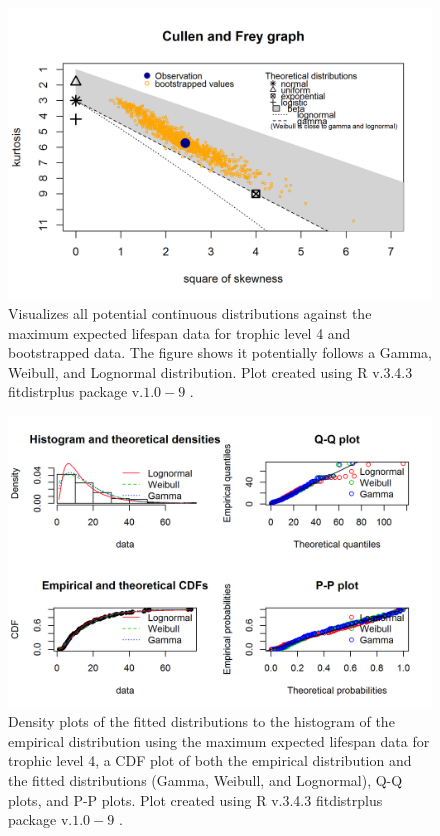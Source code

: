\documentclass[oneside,12pt,final]{sty/ucthesis-CA2012}
\let\cite\citep                             %
\begin{document}
\begin{mainmatter}
\begin{figure}[H]
     \centering
       \includegraphics[width=.8\textwidth]{fig/cullen_frey_l4}
    \caption{Visualizes all potential continuous distributions against the maximum expected lifespan data for trophic level 4 and bootstrapped data. The figure shows it potentially follows a Gamma, Weibull, and Lognormal distribution. Plot created using R v.3.4.3 \cite{Rcite} fitdistrplus package v.$1.0-9$ \cite{fitdistrplus}. }
    \label{cf_l4}
\end{figure}

\begin{figure}[H]
     \centering
       \includegraphics[width=.8\textwidth]{fig/gof_l4}
    \caption{Density plots of the fitted distributions to the histogram of the empirical distribution using the maximum expected lifespan data for trophic level 4, a CDF plot of both the empirical distribution and the fitted distributions (Gamma, Weibull, and Lognormal), Q-Q plots, and P-P plots. Plot created using R v.3.4.3 \cite{Rcite} fitdistrplus package v.$1.0-9$ \cite{fitdistrplus}. }
    \label{gof_l4}
\end{figure}



\end{mainmatter}
\end{document}
